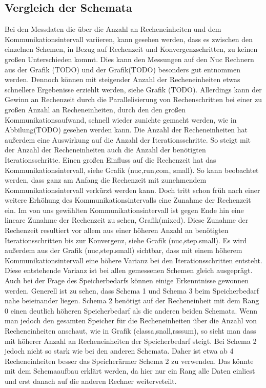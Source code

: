 \subsection{Vergleich der Schemata}
Bei den Messdaten die \"uber die Anzahl an Recheneinheiten und dem Kommunikationsintervall variieren, kann gesehen werden, dass es zwischen den einzelnen Schemen, in Bezug auf Rechenzeit und Konvergenzschritten, zu keinen gro\ss{}en Unterschieden kommt. Dies kann den Messungen auf den Nuc Rechnern aus der Grafik (TODO) und der Grafik(TODO) besonders gut entnommen werden. Dennoch k\"onnen mit steigender Anzahl der Recheneinheiten  etwas schnellere Ergebenisse erziehlt werden, siehe Grafik (TODO). Allerdings kann der Gewinn an Rechenzeit durch die Parallelisierung von Rechenschritten bei einer zu gro\ss{}en Anzahl an Recheneinheiten, durch den den gro\ss{}en Kommunikationsaufwand, schnell wieder zunichte gemacht werden, wie in Abbilung(TODO) gesehen werden kann. Die Anzahl der Recheneinheiten hat au\ss{}erdem eine Auswirkung auf die Anzahl der Iterationsschritte. So steigt mit der Anzahl der Recheneinheiten auch die Anzahl der ben\"otigten Iterationsschritte. Einen gro\ss{}en Einfluss auf die Rechenzeit hat das Kommunikationsintervall, siehe  Grafik (nuc,run,com, small). So kann beobachtet werden, dass ganz am Anfang die Rechenzeit mit zunehmendem Kommunikationsintervall verk\"urzt werden kann. Doch tritt schon fr\"uh nach einer weitere Erh\"ohung des Kommunikationsintervalls eine Zunahme der Rechenzeit ein. Im von uns gew\"ahlten Kommunikationsintervall ist gegen Ende hin eine lineare Zunahme der Rechenzeit zu sehen, Grafik(mixed). Diese Zunahme der Rechenzeit resultiert vor allem aus einer h\"oheren Anzahl an ben\"otigten Iterationsschritten bis zur Konvergenz, siehe Grafik (nuc,step.small). Es wird au\ss{}erdem aus der Grafik (nuc,step.small) sichtbar, dass mit einem h\"oherem Kommunikationsintervall eine h\"ohere Varianz bei den Iterationsschritten entsteht. Diese entstehende Varianz ist bei allen gemessenen Schemen gleich ausgepr\"agt.\\ Auch bei der Frage des Speicherbedarfs k\"onnen einige Erkenntnisse gewonnen werden. Generell ist zu sehen, dass Schema 1 und Schema 3 beim Speicherbedarf nahe beieinander liegen. Schema 2 ben\"otigt auf der Recheneinheit mit dem Rang 0 einen deutlich h\"oheren Speicherbedarf als die anderen beiden Schemata. Wenn man jedoch den gesamten Speicher f\"ur die Recheneinheiten \"uber die Anzahl von Recheneinheiten anschaut, wie in Grafik (classa,snall,rsssum), so sieht man dass mit h\"oherer Anzahl an Recheneinheiten der Speicherbedarf steigt. Bei Schema 2 jedoch nicht so stark wie bei den anderen Schemata. Daher ist etwa ab 4 Recheneinheiten besser das Speicher\"armer Schema 2 zu verwenden. Das k\"onnte mit dem Schemaaufbau erkl\"art werden, da hier nur ein Rang alle Daten einliest und erst danach auf die anderen Rechner weiterveteilt.\\
